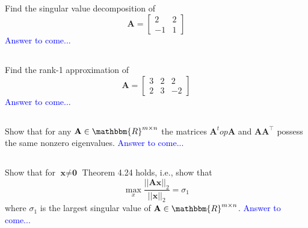 \documentclass[a4paper,12pt]{article}
\newcommand{\R}{\mathbbm{R}}
\newcommand{\M}[1]{ \begin{bmatrix} #1 \end{bmatrix} }
\newcommand{\vecx}{\textbf{x}}
\newcommand{\veco}{\textbf{0}}
\newcommand{\matA}{\textbf{A}}
\begin{document}
\subsection{}
Find the singular value decomposition of
$$\matA = \M{2&2\\-1&1}$$
\textcolor{blue}{
Answer to come...
}
\subsection{}
Find the rank-1 approximation of
$$\matA = \M{3&2&2\\2&3&-2}$$
\textcolor{blue}{
Answer to come...
}
\subsection{}
Show that for any $\matA \in \R^{m \times n}$ the matrices $\matA^top \matA$ and $\matA \matA^\top$ possess the same nonzero eigenvalues.
\textcolor{blue}{
Answer to come...
}
\subsection{}
Show that for $\vecx \neq \veco$ Theorem 4.24 holds, i.e., show that
$$\max\limits_x \dfrac{||\matA \vecx ||_2}{||\vecx||_2} = \sigma_1$$
where $\sigma_1$ is the largest singular value of $\matA \in \R^{m \times n}$.
\textcolor{blue}{
Answer to come...
}
\newpage%
\end{document}
